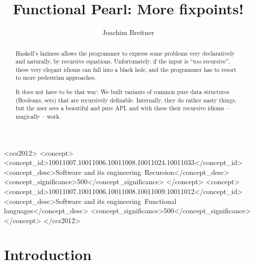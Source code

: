 \documentclass[manuscript,screen,acmsmall]{acmart}
\begin{document}
\title{Functional Pearl: More fixpoints!}

\author{Joachim Breitner}


\begin{abstract}
Haskell’s laziness allows the programmer to express some problems very declaratively and naturally, by recursive equations. Unfortunately, if the input is “too recursive”, these very elegant idioms can fall into a black hole, and the programmer has to resort to more pedestrian approaches.

It does not have to be that way: We built variants of common pure data structures (Booleans, sets) that are recursively definable. Internally, they do rather nasty things, but the user sees a beautiful and pure API, and with these their recursive idioms -- magically -- work.

\end{abstract}

\begin{CCSXML}
<ccs2012>
   <concept>
       <concept_id>10011007.10011006.10011008.10011024.10011033</concept_id>
       <concept_desc>Software and its engineering~Recursion</concept_desc>
       <concept_significance>500</concept_significance>
       </concept>
   <concept>
       <concept_id>10011007.10011006.10011008.10011009.10011012</concept_id>
       <concept_desc>Software and its engineering~Functional languages</concept_desc>
       <concept_significance>500</concept_significance>
       </concept>
 </ccs2012>
\end{CCSXML}



\maketitle

\section{Introduction}
\end{document}
